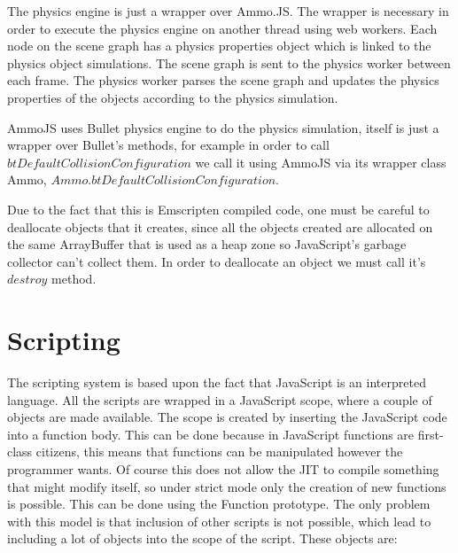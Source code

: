The physics engine is just a wrapper over Ammo.JS. The wrapper is necessary in order to execute the physics engine on another thread using web workers.
Each node on the scene graph has a physics properties object which is linked to the physics object simulations. The scene graph is sent to the physics worker between each frame. The physics worker parses the scene graph and updates the physics properties of the objects according to the physics simulation.

AmmoJS uses Bullet physics engine to do the physics simulation, itself is just a wrapper over Bullet's methods, for example in order to call $btDefaultCollisionConfiguration$ we call it using AmmoJS via its wrapper class Ammo, $Ammo.btDefaultCollisionConfiguration$.

Due to the fact that this is Emscripten compiled code, one must be careful to deallocate objects that it creates, since all the objects created are allocated on the same ArrayBuffer that is used as a heap zone so JavaScript's garbage collector can't collect them. In order to deallocate an object we must call it's $destroy$ method.
\section{Scripting}

The scripting system is based upon the fact that JavaScript is an interpreted language. All the scripts are wrapped in a JavaScript scope, where a couple of objects are made available. The scope is created by inserting the JavaScript code into a function body. This can be done because in JavaScript functions are first-class citizens, this means that functions can be manipulated however the programmer wants. Of course this does not allow the JIT to compile something that might modify itself, so under strict mode only the creation of new functions is possible. This can be done using the Function prototype.
The only problem with this model is that inclusion of other scripts is not possible, which lead to including a lot of objects into the scope of the script.
These objects are:

